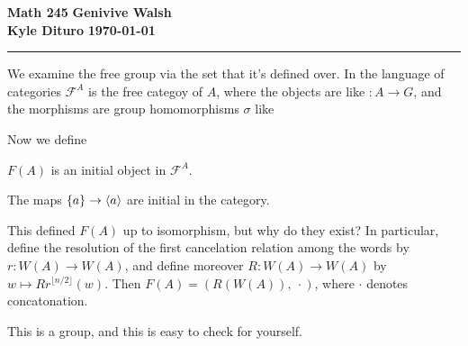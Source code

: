 \documentclass[12pt, twosided]{article}
\begin{document}
\noindent \textbf{Math 245} \hfill \textbf{Genivive Walsh} \\
\textbf{Kyle Dituro} \hfill \textbf{\today}\hrule
\vspace{.2in}

We examine the free group via the set that it's defined over. In the language of categories \(\mathscr{F}^A\) is the free categoy of \(A\), where the objects are like \(: A \to G\), and the morphisms are group homomorphisms \(\sigma\) like

\begin{center}
\end{center}

Now we define
\begin{df}
  \(F(A)\) is an initial object in \(\mathscr{F}^A\).
\end{df}

\begin{clm}
  The maps \(\left\{ a \right\} \to \langle a \rangle\) are initial in the category.
\end{clm}

This defined \(F(A)\) up to isomorphism, but why do they exist? In particular, define the resolution of the first cancelation relation among the words by \(r: W(A) \to W(A)\), and define moreover \(R:W(A) \to W(A)\) by \(w \longmapsto{R} r^{\lfloor n/2 \rfloor}(w)\). Then \(F(A) = \left(R\left(W\left(A\right)\right), \ \cdot \right)\), where \(\cdot\) denotes concatonation.

\begin{fact}
  This is a group, and this is easy to check for yourself.
\end{fact}
\end{document}

